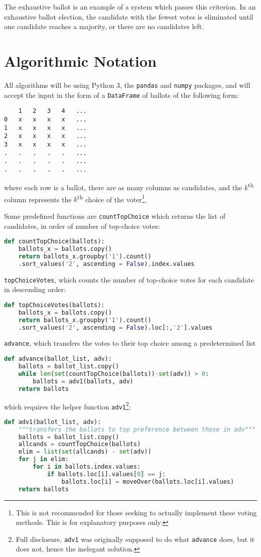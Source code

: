 \documentclass{article}
\newcommand{\super}{\textsuperscript}
\begin{document}
The exhaustive ballot is an example of a system which passes this criterion. In an exhaustive ballot election, the candidate with the fewest votes is eliminated until one candidate reaches a majority, or there are no candidates left. %

\section{Algorithmic Notation}

All algorithms will be using Python 3, the \texttt{pandas} and \texttt{numpy} packages, and will accept the input in the form of a \texttt{DataFrame} of ballots of the following form:
\begin{lstlisting}
	1	2	3	4	...
0	x	x	x	x	...
1	x	x	x	x	...
2	x	x	x	x	...
3	x	x	x	x	...
.	.	.	.	.	...
.	.	.	.	.	...
.	.	.	.	.	...
\end{lstlisting}
where each row is a ballot, there are as many columns as candidates, and the $k$\super{th} column represents the $k$\super{th} choice of the voter\footnote{This is not recommended for those seeking to actually implement these voting methods. This is for explanatory purposes only.}.

Some predefined functions are \texttt{countTopChoice} which returns the list of candidates, in order of number of top-choice votes:
\begin{lstlisting}[language = Python]
def countTopChoice(ballots):
    ballots_x = ballots.copy()
    return ballots_x.groupby('1').count()
    .sort_values('2', ascending = False).index.values
\end{lstlisting}
\texttt{topChoiceVotes}, which counts the number of top-choice votes for each candidate in descending order:
\begin{lstlisting}[language = Python]
def topChoiceVotes(ballots):
    ballots_x = ballots.copy()
    return ballots_x.groupby('1').count()
    .sort_values('2', ascending = False).loc[:,'2'].values
\end{lstlisting}
\texttt{advance}, which transfers the votes to their top choice among a predetermined list 
\begin{lstlisting}[language = Python]
def advance(ballot_list, adv):
    ballots = ballot_list.copy()
    while len(set(countTopChoice(ballots))-set(adv)) > 0:
        ballots = adv1(ballots, adv)
    return ballots
\end{lstlisting}
which requires the helper function \texttt{adv1}\footnote{Full disclosure, \texttt{adv1} was originally supposed to do what \texttt{advance} does, but it does not, hence the inelegant solution.}:
\begin{lstlisting}[language = Python]
def adv1(ballot_list, adv):
    """transfers the ballots to top preference between those in adv"""
    ballots = ballot_list.copy()
    allcands = countTopChoice(ballots)
    elim = list(set(allcands) - set(adv))
    for j in elim:
        for i in ballots.index.values:
            if ballots.loc[i].values[0] == j:
                ballots.loc[i] = moveOver(ballots.loc[i].values)
    return ballots
\end{lstlisting}
\end{document}
